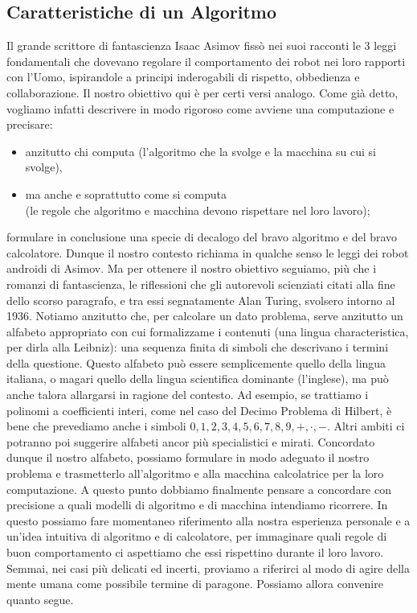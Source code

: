 \subsection{Caratteristiche di un Algoritmo}

Il grande scrittore di fantascienza Isaac Asimov fissò nei suoi racconti le 3 leggi
fondamentali che dovevano regolare il comportamento dei robot nei loro rapporti
con l'Uomo, ispirandole a principi inderogabili di rispetto, obbedienza e collaborazione.
Il nostro obiettivo qui è per certi versi analogo. Come già detto, vogliamo
infatti descrivere in modo rigoroso come avviene una computazione e precisare:

\begin{itemize}
    \item anzitutto chi computa (l'algoritmo che la svolge e la macchina su cui si svolge),
    \item ma anche e soprattutto come si computa\\
          (le regole che algoritmo e macchina
          devono rispettare nel loro lavoro);
\end{itemize}

formulare in conclusione una specie di decalogo del bravo algoritmo e del bravo
calcolatore. Dunque il nostro contesto richiama in qualche senso le leggi dei robot androidi di Asimov.
Ma per ottenere il nostro obiettivo seguiamo, più che i romanzi di fantascienza, le riflessioni che gli
autorevoli scienziati citati alla fine dello scorso paragrafo, e tra essi segnatamente Alan Turing,
svolsero intorno al 1936.
Notiamo anzitutto che, per calcolare un dato problema, serve anzitutto un alfabeto appropriato con cui formalizzame i
contenuti (una lingua characteristica, per dirla alla Leibniz): una sequenza finita di simboli che descrivano i termini
della questione. Questo alfabeto può essere semplicemente quello della lingua italiana, o magari quello della lingua
scientifica dominante (l'inglese), ma può anche talora allargarsi in ragione del contesto.
Ad esempio, se trattiamo i polinomi a coefficienti interi, come nel caso del Decimo Problema di Hilbert,
è bene che prevediamo anche i simboli $0, 1, 2, 3, 4, 5, 6, 7, 8, 9, +, \cdot, -$. Altri ambiti ci potranno
poi suggerire alfabeti ancor più specialistici e mirati. Concordato dunque il nostro alfabeto,
possiamo formulare in modo adeguato il nostro problema e trasmetterlo all'algoritmo e alla macchina calcolatrice
per la loro computazione.
A questo punto dobbiamo finalmente pensare a concordare con precisione a quali
modelli di algoritmo e di macchina intendiamo ricorrere. In questo possiamo fare
momentaneo riferimento alla nostra esperienza personale e a un'idea intuitiva di
algoritmo e di calcolatore, per immaginare quali regole di buon comportamento ci
aspettiamo che essi rispettino durante il loro lavoro. Semmai, nei casi più delicati
ed incerti, proviamo a riferirci al modo di agire della mente umana come possibile
termine di paragone. Possiamo allora convenire quanto segue.

